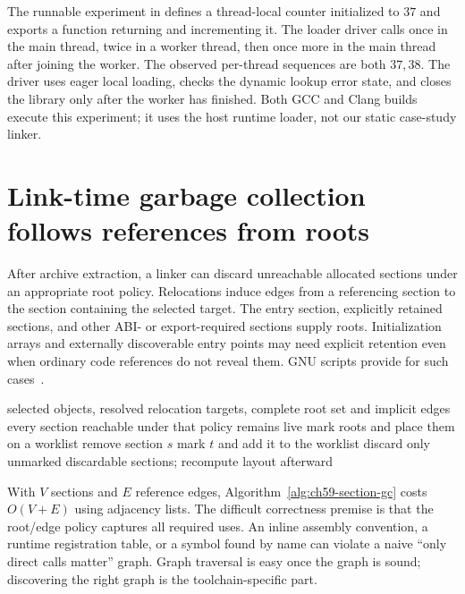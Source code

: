The runnable experiment in  defines a thread-local counter initialized to $37$ and exports a function returning and incrementing it.
The loader driver calls once in the main thread, twice in a worker thread, then once more in the main thread after joining the worker.
The observed per-thread sequences are both $37,38$.
The driver uses eager local loading, checks the dynamic lookup error state, and closes the library only after the worker has finished.
Both GCC and Clang builds execute this experiment; it uses the host runtime loader, not our static case-study linker.

\section{Link-time garbage collection follows references from roots}
\label{sec:ch59-gc}

After archive extraction, a linker can discard unreachable allocated sections under an appropriate root policy.
Relocations induce edges from a referencing section to the section containing the selected target.
The entry section, explicitly retained sections, and other ABI- or export-required sections supply roots.
Initialization arrays and externally discoverable entry points may need explicit retention even when ordinary code references do not reveal them.
GNU scripts provide  for such cases~\cite{gnu-2026-ld}.

\begin{algorithm}[htbp]
\caption{Compute live input sections from a declared root and reference policy.}
\label{alg:ch59-section-gc}
\begin{pseudocode}
\Require selected objects, resolved relocation targets, complete root set and implicit edges
\Ensure every section reachable under that policy remains live
\State mark roots and place them on a worklist
  \State remove section $s$
      \State mark $t$ and add it to the worklist
    \EndIf
  \EndFor
\EndWhile
\State discard only unmarked discardable sections; recompute layout afterward
\end{pseudocode}
\end{algorithm}

With $V$ sections and $E$ reference edges, Algorithm~\ref{alg:ch59-section-gc} costs $O(V+E)$ using adjacency lists.
The difficult correctness premise is that the root/edge policy captures all required uses.
An inline assembly convention, a runtime registration table, or a symbol found by name can violate a naive \enquote{only direct calls matter} graph.
Graph traversal is easy once the graph is sound; discovering the right graph is the toolchain-specific part.

